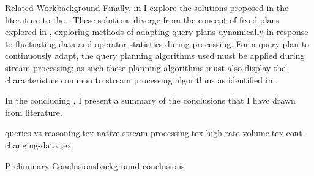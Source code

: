 \begin{nestedsection}{Related Work}{background}
	Finally, in  I explore the solutions proposed in the literature to the .
	These solutions diverge from the concept of fixed plans explored in , exploring methods of adapting query plans dynamically in response to fluctuating data and operator statistics during processing.
	For a query plan to continuously adapt, the query planning algorithms used must be applied during stream processing;
	as such these planning algorithms must also display the characteristics common to stream processing algorithms as identified in .

	In the concluding , I present a summary of the conclusions that I have drawn from literature.




	{queries-vs-reasoning.tex}
	{native-stream-processing.tex}
	{high-rate-volume.tex}
	{cont-changing-data.tex}

	
	\begin{nestedsection}{Preliminary Conclusions}{background-conclusions}
		
	\end{nestedsection}
\end{nestedsection}
